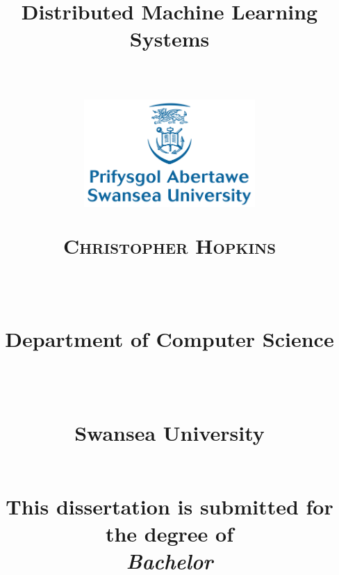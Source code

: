 
\newcommand{\horrule}[1]{\rule{\linewidth}{#1}} %
\title{
\begin{Huge}\textbf{Distributed Machine Learning Systems} \end{Huge} \\%
\vspace{70px}
\includegraphics[width = 65mm]{Figs/SwanseaUniversity.png}\\[8ex]
\begin{large} \textsc{\textbf{Christopher Hopkins}} \end{large} \\ %
\vspace{10px}
\normalfont \normalsize 
\begin{normalsize}Department of Computer Science \end{normalsize}\\  %
\begin{normalsize} Swansea University \end{normalsize} \\ %
\vspace{60px}
This dissertation is submitted for the degree of\\
\textit{Bachelor}
\vspace{20px}
}

